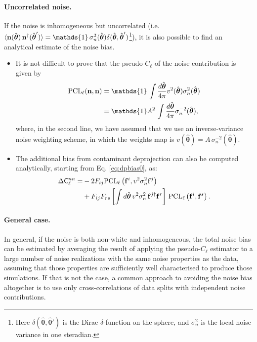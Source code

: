 \documentclass[usenatbib]{mnrasb}
\newcommand{\nv}{\hat{\boldsymbol{\theta}}}
\newcommand{\mI}{{\mathds{1}}}
\begin{document}
         \paragraph*{Uncorrelated noise.}
           If the noise is inhomogeneous but uncorrelated (i.e. $\langle {\bf n}(\nv)\,{\bf n}^\dag(\nv')\rangle=\mI\,\sigma_n^2(\nv)\delta(\nv,\nv')$\footnote{Here $\delta(\nv,\nv')$ is the Dirac $\delta$-function on the sphere, and $\sigma_n^2$ is the local noise variance in one steradian.}), it is also possible to find an analytical estimate of the noise bias.
           \begin{itemize}
             \item It is not difficult to prove that the pseudo-$C_\ell$ of the noise contribution is given by
                   \begin{align}
                     {\rm PCL}_\ell({\bf n},{\bf n})&=\mI\,\int \frac{d\nv}{4\pi}v^2(\nv)\sigma_n^2(\nv)\\
                                                    &=\mI A^2\,\int \frac{d\nv}{4\pi}\sigma_n^{-2}(\nv),
                   \end{align}
                   where, in the second line, we have assumed that we use an inverse-variance noise weighting scheme, in which the weights map is $v(\nv)=A\,\sigma_n^{-2}(\nv)$.
             \item The additional bias from contaminant deprojection can also be computed analytically, starting from Eq. \ref{eq:dpbias0}, as:
                   \begin{align}\nonumber
                     \Delta{\sf C}^{nn}_\ell=&-2F_{ij}{\rm PCL}_\ell\left({\bf f}^i,v^2\sigma_n^2{\bf f}^j\right)\\
                     &+F_{ij}F_{rs}\left[\int d\nv\, v^2\sigma_n^2\,{\bf f}^{j\dag}{\bf f}^r\right]\,{\rm PCL}_\ell\left({\bf f}^i,{\bf f}^s\right).
                   \end{align}
           \end{itemize}

        
        \paragraph*{General case.} In general, if the noise is both non-white and inhomogeneous, the total noise bias can be estimated by averaging the result of applying the pseudo-$C_\ell$ estimator to a large number of noise realizations with the same noise properties as the data, assuming that those properties are sufficiently well characterised to produce those simulations. If that is not the case, a common approach to avoiding the noise bias altogether is to use only cross-correlations of data splits with independent noise contributions.
\end{document}
